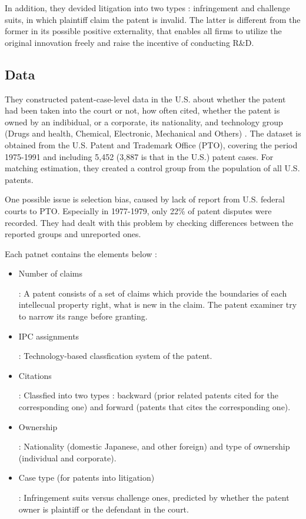 \documentclass{jsarticle}[12pt]
\begin{document}
  In addition, they devided litigation into two types : infringement and challenge suits, in which plaintiff claim the patent is invalid. The latter is different from the former in its possible positive externality, that enables all firms to utilize the original innovation freely and raise the incentive of conducting R\&D.
  
  \subsection{Data}
  
  They constructed patent-case-level data in the U.S. about whether the patent had been taken into the court or not, how often cited, whether the patent is owned by an indibidual, or a corporate, its nationality,  and technology group (Drugs and health, Chemical, Electronic, Mechanical and Others) . The dataset is obtained from the U.S. Patent and Trademark Office (PTO), covering the period 1975-1991 and including 5,452 (3,887 is that in the U.S.) patent cases. For matching estimation, they created a control group from the population of all U.S. patents. 
  
  One possible issue is selection bias, caused by lack of report from U.S. federal courts to PTO. Especially in 1977-1979, only 22\% of patent disputes were recorded. They had dealt with this problem by checking differences between the reported groups and unreported ones.
  
  Each patnet contains the elements below :
  
   \begin{itemize}
   
   \item Number of claims
   
   : A patent consists of a set of claims which provide the boundaries of each intellecual property right, what is new in the claim. The patent examiner try to narrow its range before granting.
   
   \item IPC assignments
   
   : Technology-based classfication system of the patent.
   
   \item Citations
   
   : Classfied into two types : backward (prior related patents cited for the corresponding one) and forward (patents that cites the corresponding one).
   
   \item Ownership
   
   : Nationality (domestic Japanese, and other foreign) and type of ownership (individual and corporate).
   
   \item Case type (for patents into litigation)
   
   : Infringement suits versus challenge ones, predicted by whether the patent owner is plaintiff or the defendant in the court.
   
   \end{itemize}
  
\end{document}
